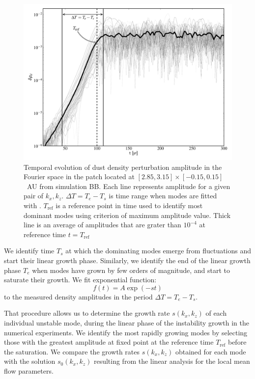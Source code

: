 \begin{figure}
  \includegraphics[width=0.98\linewidth]{figures/fig7}

  \caption{Temporal evolution of dust density perturbation amplitude in the
     Fourier space in the patch located at $[2.85,3.15]\times[-0.15,0.15]$~AU
     from simulation BB.  Each line represents amplitude for a given pair of
     $k_x, k_z$.  $\Delta T = T_e - T_s$ is time range when modes are fitted
     with .  $T_{\textrm{ref}}$ is a reference point in time used
     to identify most dominant modes using criterion of maximum amplitude value.
     Thick line is an average of amplitudes that are grater than $10^{-4}$ at
     reference time $t = T_{\textrm{ref}}$
   } 
   \label{fig7} 
\end{figure}

We identify time $T_s$ at which the dominating modes emerge from fluctuations
and start their linear growth phase. Similarly, we identify the end of the
linear growth phase $T_e$ when modes have grown by few orders of magnitude, and
start to saturate their growth. We fit exponential function:
%
\begin{equation}
   f(t) = A\exp\left(-s t\right)
   \label{eq:fit}
\end{equation}
%
 to the measured density amplitudes in the  period $\Delta T = T_e - T_s$.

That procedure allows us to determine the growth rate $s(k_x, k_z)$ of each
individual unstable mode, during the linear phase of the instability growth in
the numerical experiments.  We identify the most rapidly growing modes by
selecting those with the greatest amplitude at fixed point at the reference time
$T_{\textrm{ref}}$ before the saturation. We compare the growth rates $s(k_x,
k_z)$ obtained for each mode  with the solution $s_0(k_x, k_z)$ resulting from
the linear analysis for the local mean flow parameters. 

